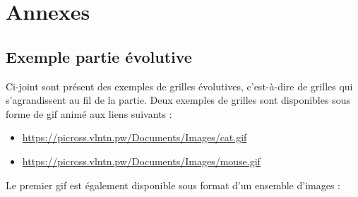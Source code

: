 \documentclass{report}
\begin{document}
\chapter{Annexes}
\thispagestyle{empty}
\thispagestyle{plain}

		\section{Exemple partie évolutive}
		\label{exemple_partie_evolutive}
	
		Ci-joint sont présent des exemples de grilles évolutives, c'est-à-dire de grilles qui s'agrandissent au fil de la partie.
		Deux exemples de grilles sont disponibles sous forme de gif animé aux liens suivants :
		 \begin{itemize}
    		 \item \url{https://picross.vlntn.pw/Documents/Images/cat.gif}
   	   	 \item \url{https://picross.vlntn.pw/Documents/Images/mouse.gif}
		 \end{itemize}
		
		Le premier gif est également disponible sous format d'un ensemble d'images :
	
\end{document}

